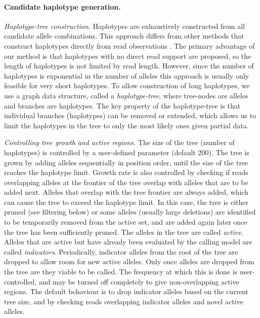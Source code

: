 \documentclass[notitlepage, twocolumn, 10pt]{article}
\begin{document}
\paragraph*{Candidate haplotype generation.} \emph{Haplotype-tree construction.} Haplotypes are exhaustively constructed from all candidate allele combinations. This approach differs from other methods that construct haplotypes directly from read observations \cite{RN141, RN538}. The primary advantage of our method is that haplotypes with no direct read support are proposed, so the length of haplotypes is not limited by read length. However, since the number of haplotypes is exponential in the number of alleles this approach is usually only feasible for very short haplotypes. To allow construction of long haplotypes, we use a graph data structure, called a \emph{haplotype-tree}, where tree-nodes are alleles and branches are haplotypes. The key property of the haplotype-tree is that individual branches (haplotypes) can be removed or extended, which allows us to limit the haplotypes in the tree to only the most likely ones given partial data.

\vspace{3mm}
\noindent\emph{Controlling tree growth and active regions.} The size of the tree (number of haplotypes) is controlled by a user-defined parameter (default 200). The tree is grown by adding alleles sequentially in position order, until the size of the tree reaches the haplotype limit. Growth rate is also controlled by checking if reads overlapping alleles at the frontier of the tree overlap with alleles that are to be added next. Alleles that overlap with the tree frontier are always added, which can cause the tree to exceed the haplotype limit. In this case, the tree is either pruned (see filtering below) or some alleles (usually large deletions) are identified to be temporarily removed from the active set, and are added again later once the tree has been sufficiently pruned. The alleles in the tree are called \emph{active}. Alleles that are active but have already been evaluated by the calling model are called \emph{indicators}. Periodically, indicator alleles from the root of the tree are dropped to allow room for new active alleles. Only once alleles are dropped from the tree are they viable to be called. The frequency at which this is done is user-controlled, and may be turned off completely to give non-overlapping active regions. The default behaviour is to drop indicator alleles based on the current tree size, and by checking reads overlapping indicator alleles and novel active alleles.
\end{document}
